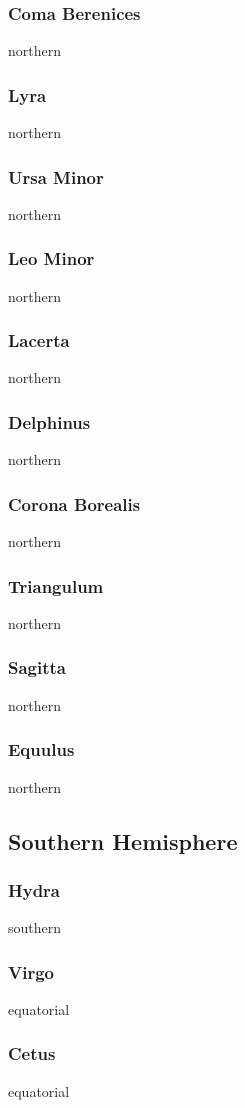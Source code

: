 \subsubsection{Coma Berenices}
northern
\subsubsection{Lyra}
northern
\subsubsection{Ursa Minor}
northern
\subsubsection{Leo Minor}
northern
\subsubsection{Lacerta}
northern
\subsubsection{Delphinus}
northern
\subsubsection{Corona Borealis}
northern
\subsubsection{Triangulum}
northern
\subsubsection{Sagitta}
northern
\subsubsection{Equulus}
northern

\subsection{Southern Hemisphere}
\subsubsection{Hydra}
southern
\subsubsection{Virgo}
equatorial
\subsubsection{Cetus}
equatorial
